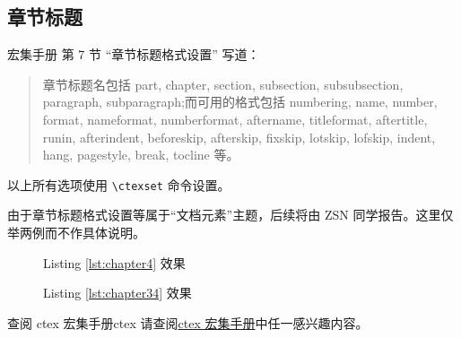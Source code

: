 \subsection{章节标题}
\CTeX 宏集手册 \cite{ctex} 第 7 节 “章节标题格式设置” 写道：
\begin{quote}
章节标题名包括 part, chapter, section, subsection, subsubsection,
paragraph, subparagraph;而可用的格式包括 numbering, name, number, format, nameformat, numberformat, aftername, titleformat, aftertitle, runin, afterindent, beforeskip, afterskip, fixskip, lotskip, lofskip, indent, hang, pagestyle, break, tocline 等。
\end{quote}
以上所有选项使用 \verb|\ctexset| 命令设置。

由于章节标题格式设置等属于“文档元素”主题，后续将由 ZSN 同学报告。这里仅举两例而不作具体说明。

\begin{figure}
\centering
\caption{Listing \ref{lst:chapter4} 效果}
\label{img:4}
\end{figure}
\begin{figure}
\centering
{}
\caption{Listing \ref{lst:chapter34} 效果}
\label{img:34}
\end{figure}


\begin{Ex}{查阅 ctex 宏集手册}{ctex}
请查阅\href{http://mirrors.ctan.org/language/chinese/ctex/ctex.pdf}{ctex 宏集手册}中任一感兴趣内容。
\end{Ex}